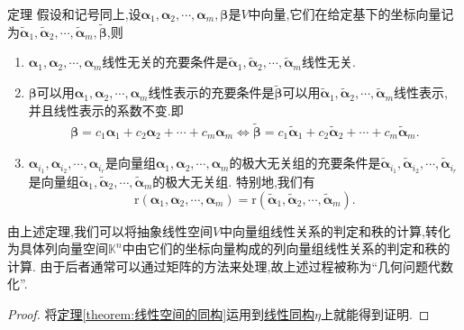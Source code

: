 \documentclass[../../main.tex]{subfiles}%
\begin{document}
\begin{theorem}\label{theorem:线性空间的同构11}
定理 假设和记号同上,设\(\boldsymbol{\alpha}_1,\boldsymbol{\alpha}_2,\cdots,\boldsymbol{\alpha}_m,\boldsymbol{\beta}\)是\(V\)中向量,它们在给定基下的坐标向量记为\(\widetilde{\boldsymbol{\alpha}}_1,\widetilde{\boldsymbol{\alpha}}_2,\cdots,\widetilde{\boldsymbol{\alpha}}_m,\widetilde{\boldsymbol{\beta}}\),则
\begin{enumerate}[(1)]
\item \(\boldsymbol{\alpha}_1,\boldsymbol{\alpha}_2,\cdots,\boldsymbol{\alpha}_m\)线性无关的充要条件是\(\widetilde{\boldsymbol{\alpha}}_1,\widetilde{\boldsymbol{\alpha}}_2,\cdots,\widetilde{\boldsymbol{\alpha}}_m\)线性无关.

\item \(\boldsymbol{\beta}\)可以用\(\boldsymbol{\alpha}_1,\boldsymbol{\alpha}_2,\cdots,\boldsymbol{\alpha}_m\)线性表示的充要条件是\(\widetilde{\boldsymbol{\beta}}\)可以用\(\widetilde{\boldsymbol{\alpha}}_1,\widetilde{\boldsymbol{\alpha}}_2,\cdots,\widetilde{\boldsymbol{\alpha}}_m\)线性表示,
并且线性表示的系数不变.即\begin{align*}
\boldsymbol{\beta }=c_1\boldsymbol{\alpha }_1+c_2\boldsymbol{\alpha }_2+\cdots +c_m\boldsymbol{\alpha }_m\Leftrightarrow \widetilde{\boldsymbol{\beta }}=c_1\widetilde{\boldsymbol{\alpha }}_1+c_2\widetilde{\boldsymbol{\alpha }}_2+\cdots +c_m\widetilde{\boldsymbol{\alpha }}_m.
\end{align*}

\item \(\boldsymbol{\alpha}_{i_1},\boldsymbol{\alpha}_{i_2},\cdots,\boldsymbol{\alpha}_{i_r}\)是向量组\(\boldsymbol{\alpha}_1,\boldsymbol{\alpha}_2,\cdots,\boldsymbol{\alpha}_m\)的极大无关组的充要条件是\(\widetilde{\boldsymbol{\alpha}}_{i_1},\widetilde{\boldsymbol{\alpha}}_{i_2},\cdots,\widetilde{\boldsymbol{\alpha}}_{i_r}\)是向量组\(\widetilde{\boldsymbol{\alpha}}_1,\widetilde{\boldsymbol{\alpha}}_2,\cdots,\widetilde{\boldsymbol{\alpha}}_m\)的极大无关组. 特别地,我们有
\[
\mathrm{r}(\boldsymbol{\alpha}_1,\boldsymbol{\alpha}_2,\cdots,\boldsymbol{\alpha}_m)=\mathrm{r}(\widetilde{\boldsymbol{\alpha}}_1,\widetilde{\boldsymbol{\alpha}}_2,\cdots,\widetilde{\boldsymbol{\alpha}}_m).
\]
\end{enumerate}
\end{theorem}
\begin{note}
由上述定理,我们可以将抽象线性空间\(V\)中向量组线性关系的判定和秩的计算,转化为具体列向量空间\(\mathbb{K}^n\)中由它们的坐标向量构成的列向量组线性关系的判定和秩的计算. 由于后者通常可以通过矩阵的方法来处理,故上述过程被称为“几何问题代数化”.
\end{note}
\begin{proof}
将\hyperref[theorem:线性空间的同构]{定理\ref{theorem:线性空间的同构}}运用到\hyperlink{线性同构1}{线性同构$\eta$}上就能得到证明.
\end{proof}
\end{document}
